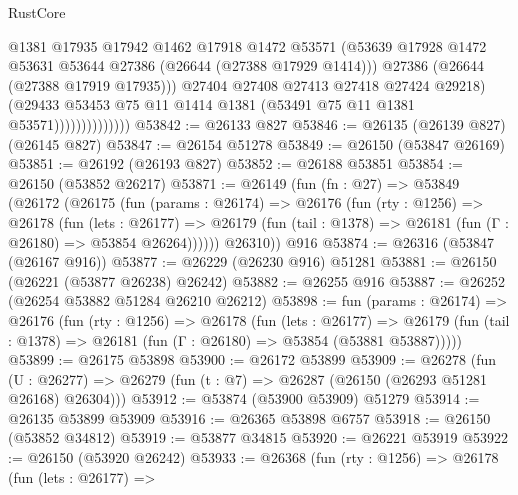 \begin{lexlean}{RustCore}
\begin{coremodule}
                                @1381
                                @17935
                                @17942
                                @1462
                                @17918
                                @1472
                                @53571
                                (@53639
                                  @17928
                                  @1472
                                  @53631
                                  @53644
                                  @27386
                                  (@26644 (@27388 @17929 @1414)))
                                @27386
                                (@26644 (@27388 @17919 @17935)))
                              @27404
                              @27408
                              @27413
                              @27418
                              @27424
                              @29218)
                            (@29433
                              @53453
                              @75
                              @11
                              @1414
                              @1381
                              (@53491 @75 @11 @1381 @53571))))))))))))))
@53842 := @26133 @827
@53846 := @26135 (@26139 @827) (@26145 @827)
@53847 := @26154 @51278
@53849 := @26150 (@53847 @26169)
@53851 := @26192 (@26193 @827)
@53852 := @26188 @53851
@53854 := @26150 (@53852 @26217)
@53871 := @26149
    (fun (fn : @27) =>
    @53849
      (@26172
        (@26175
          (fun (params : @26174) =>
          @26176
            (fun (rty : @1256) =>
            @26178
              (fun (lets : @26177) =>
              @26179 (fun (tail : @1378) => @26181 (fun (Γ : @26180) => @53854 @26264))))))
        @26310))
    @916
@53874 := @26316 (@53847 (@26167 @916))
@53877 := @26229 (@26230 @916) @51281
@53881 := @26150 (@26221 (@53877 @26238) @26242)
@53882 := @26255 @916
@53887 := @26252 (@26254 @53882 @51284 @26210 @26212)
@53898 := fun (params : @26174) =>
  @26176
    (fun (rty : @1256) =>
    @26178
      (fun (lets : @26177) =>
      @26179 (fun (tail : @1378) => @26181 (fun (Γ : @26180) => @53854 (@53881 @53887)))))
@53899 := @26175 @53898
@53900 := @26172 @53899
@53909 := @26278
    (fun (U : @26277) => @26279 (fun (t : @7) => @26287 (@26150 (@26293 @51281 @26168) @26304)))
@53912 := @53874 (@53900 @53909) @51279
@53914 := @26135 @53899 @53909
@53916 := @26365 @53898 @6757
@53918 := @26150 (@53852 @34812)
@53919 := @53877 @34815
@53920 := @26221 @53919
@53922 := @26150 (@53920 @26242)
@53933 := @26368
    (fun (rty : @1256) =>
    @26178
      (fun (lets : @26177) =>

\end{coremodule}
\end{lexlean}
